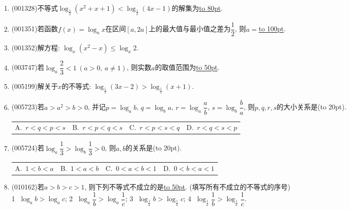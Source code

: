 \documentclass[10pt,a4paper]{article}
\newcommand{\blank}[1]{\underline{\hbox to #1pt{}}}
\newcommand{\bracket}[1]{(\hbox to #1pt{})}
\newcommand{\fourch}[4]{\par\begin{tabular}{p{.23\textwidth}p{.23\textwidth}p{.23\textwidth}p{.23\textwidth}}
A.~#1 &B.~#2& C.~#3& D.~#4
\end{tabular}}
\begin{document}
\begin{enumerate}[1.]
\item {\tiny (001328)}不等式$\log_{\frac{1}{2}}(x^2+x+1)<\log_{\frac{1}{2}}(4x-1)$的解集为\blank{80}.
\item {\tiny (001351)}若函数$f(x)=\log_a x$在区间$[a,2a]$上的最大值与最小值之差为$\dfrac{1}{2}$, 则$a=$\blank{100}.
\item {\tiny (001352)}解方程: $\log_x(x^2-x)\le \log_x 2$.
\item {\tiny (003747)}若$\log_a \dfrac 23<1 \ (a>0, \ a\ne 1)$, 则实数$a$的取值范围为\blank{50}.
\item {\tiny (005199)}解关于$x$的不等式: $\log_{\frac 12}(3x-2)>\log_{\frac 12}(x+1)$.
\item {\tiny (005723)}若$a>a^2>b>0$, 并记$p=\log_ab$, $q=\log_ba$, $r=\log_a\dfrac ab$, $s=\log_b\dfrac ba$, 则$p,q,r,s$的大小关系是\bracket{20}.
\fourch{$r<q<p<s$}{$r<p<q<s$}{$r<p<s<q$}{$r<q<s<p$}
\item {\tiny (005724)}若$\log_a\dfrac 13>\log_b\dfrac 13>0$, 则$a,b$的关系是\bracket{20}.
\fourch{$1<b<a$}{$1<a<b$}{$0<a<b<1$}{$0<b<a<1$}
\item {\tiny (010162)}若$a>b>c>1$, 则下列不等式不成立的是\blank{50}. (填写所有不成立的不等式的序号)\\
\textcircled{1} $\log_ab>\log_ac$; \textcircled{2} $\log_a\dfrac 1b>\log_a\dfrac 1c$; \textcircled{3} $\log_{\frac 1a}b>\log_{\frac 1a}c$; \textcircled{4} $\log_{\frac 1a}\dfrac 1b>\log_{\frac 1a}\dfrac 1c$.
\end{enumerate}
\end{document}
